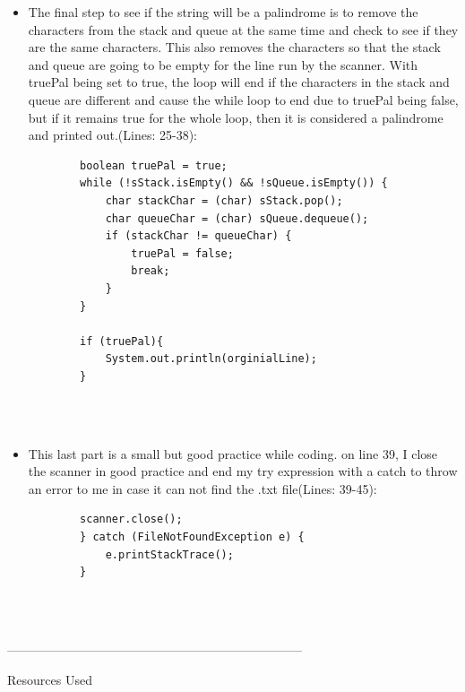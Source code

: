 \documentclass[a4paper,12pt]{article}
\begin{document}
\begin{itemize}
\begin{itemize}
\item The final step to see if the string will be a palindrome is to remove the characters from the stack and queue at the same time and check to see if they are the same characters. This also removes the characters so that the stack and queue are going to be empty for the line run by the scanner. With truePal being set to true, the loop will end if the characters in the stack and queue are different and cause the while loop to end due to truePal being false, but if it remains true for the whole loop, then it is considered a palindrome and printed out.(Lines: 25-38):
\begin{verbatim}
        boolean truePal = true;
        while (!sStack.isEmpty() && !sQueue.isEmpty()) { 
            char stackChar = (char) sStack.pop();         
            char queueChar = (char) sQueue.dequeue();   
            if (stackChar != queueChar) { 
                truePal = false;
                break;
            }
        }

        if (truePal){
            System.out.println(orginialLine);
        }


\end{verbatim}\\

\item This last part is a small but good practice while coding. on line 39, I close the scanner in good practice and end my try expression with a catch to throw an error to me in case it can not find the .txt file(Lines: 39-45):
\begin{verbatim}
        scanner.close(); 
        } catch (FileNotFoundException e) { 
            e.printStackTrace();
        }


\end{verbatim}\\



\end{itemize}


\end{itemize}

\begin{center}
    -----------------------------------------------------------------------
\end{center}

\begin{center}
\begin{large}
    Resources Used
\end{large}
\end{center}
\end{document}
